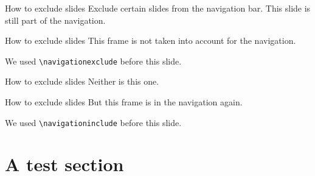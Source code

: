 \documentclass[aspectratio=169]{beamer}
\begin{document}
\begin{frame}{How to exclude slides}
	Exclude certain slides from the navigation bar. This slide is still part of the navigation.
\end{frame}

\navigationexclude
\begin{frame}{How to exclude slides}
	This frame is not taken into account for the navigation.
	
	We used \texttt{\textbackslash navigationexclude} before this slide.
\end{frame}

\begin{frame}{How to exclude slides}
	Neither is this one.
\end{frame}

\navigationinclude
\begin{frame}{How to exclude slides}
	But this frame is in the navigation again.
	
	We used \texttt{\textbackslash navigationinclude} before this slide.
\end{frame}


\begin{frame}
	\lipsum[2]
\end{frame}

\section{A test section}
\rptusectionpage
\begin{frame}
	\lipsum[5]
\end{frame}

\begin{frame}
	\lipsum[6]
\end{frame}
\end{document}
